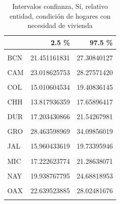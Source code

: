 \documentclass[
]{article}
\begin{document}
\begin{table}[H]

\caption{\label{tab:unnamed-chunk-21}Intervalos confianza, Sí, relativo entidad, 
    condición de hogares con necesidad de vivienda}
\centering
\begin{tabular}[t]{lrr}
\toprule
  & 2.5 \% & 97.5 \%\\
\midrule
\cellcolor{gray!6}{AGU} & \cellcolor{gray!6}{13.664530469} & \cellcolor{gray!6}{17.26037588}\\
BCN & 21.451161831 & 27.30840127\\
\cellcolor{gray!6}{BCS} & \cellcolor{gray!6}{23.007442483} & \cellcolor{gray!6}{29.13333186}\\
CAM & 23.018625753 & 28.27571420\\
\cellcolor{gray!6}{COA} & \cellcolor{gray!6}{15.908395509} & \cellcolor{gray!6}{19.98139497}\\
\addlinespace
COL & 15.010604534 & 19.40836145\\
\cellcolor{gray!6}{CHP} & \cellcolor{gray!6}{25.080637964} & \cellcolor{gray!6}{29.82607048}\\
CHH & 13.817936359 & 17.65896417\\
\cellcolor{gray!6}{CMX} & \cellcolor{gray!6}{24.630193093} & \cellcolor{gray!6}{29.42570276}\\
DUR & 17.203430866 & 21.54267981\\
\addlinespace
\cellcolor{gray!6}{GUA} & \cellcolor{gray!6}{17.737681553} & \cellcolor{gray!6}{21.82742112}\\
GRO & 28.463598969 & 34.09856019\\
\cellcolor{gray!6}{HID} & \cellcolor{gray!6}{14.076493937} & \cellcolor{gray!6}{17.96919369}\\
JAL & 15.960433619 & 19.73395946\\
\cellcolor{gray!6}{MEX} & \cellcolor{gray!6}{16.362043839} & \cellcolor{gray!6}{20.43924584}\\
\addlinespace
MIC & 17.222623774 & 21.28638071\\
\cellcolor{gray!6}{MOR} & \cellcolor{gray!6}{16.108892992} & \cellcolor{gray!6}{20.62516867}\\
NAY & 19.938767795 & 24.68818953\\
\cellcolor{gray!6}{NLE} & \cellcolor{gray!6}{9.605686398} & \cellcolor{gray!6}{13.58102901}\\
OAX & 22.639523885 & 28.02481676\\
\addlinespace
\cellcolor{gray!6}{PUE} & \cellcolor{gray!6}{21.157556200} & \cellcolor{gray!6}{26.68294471}\\

\end{tabular}
\end{table}
\end{document}
